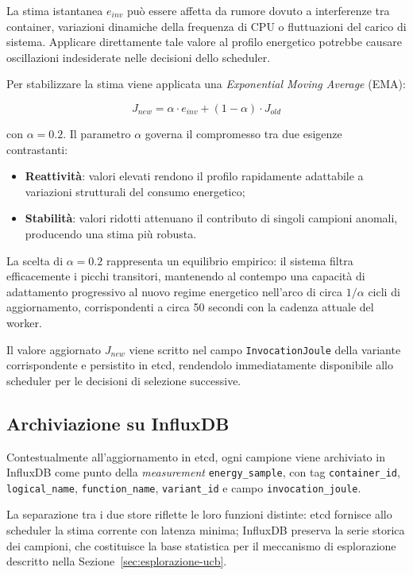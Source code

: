 La stima istantanea $e_{inv}$ può essere affetta da rumore dovuto a
interferenze tra container, variazioni dinamiche della frequenza di CPU
o fluttuazioni del carico di sistema. Applicare direttamente tale valore
al profilo energetico potrebbe causare oscillazioni indesiderate nelle
decisioni dello scheduler.

Per stabilizzare la stima viene applicata una \emph{Exponential Moving
Average} (EMA):

\begin{equation}
    J_{new} = \alpha \cdot e_{inv} + (1 - \alpha) \cdot J_{old}
\end{equation}

con $\alpha = 0.2$. Il parametro $\alpha$ governa il compromesso tra
due esigenze contrastanti:

\begin{itemize}
    \item \textbf{Reattività}: valori elevati rendono il profilo
    rapidamente adattabile a variazioni strutturali del consumo energetico;
    \item \textbf{Stabilità}: valori ridotti attenuano il contributo
    di singoli campioni anomali, producendo una stima più robusta.
\end{itemize}

La scelta di $\alpha = 0.2$ rappresenta un equilibrio empirico: il
sistema filtra efficacemente i picchi transitori, mantenendo al
contempo una capacità di adattamento progressivo al nuovo regime
energetico nell'arco di circa $1/\alpha$ cicli di aggiornamento,
corrispondenti a circa 50 secondi con la cadenza attuale del worker.

Il valore aggiornato $J_{new}$ viene scritto nel campo
\texttt{InvocationJoule} della variante corrispondente e persistito in
etcd, rendendolo immediatamente disponibile allo scheduler per le
decisioni di selezione successive.



\subsection{Archiviazione su InfluxDB}
\label{subsec:influxdb}

Contestualmente all'aggiornamento in etcd, ogni campione viene archiviato
in InfluxDB come punto della \emph{measurement} \texttt{energy\_sample},
con tag \texttt{container\_id}, \texttt{logical\_name},
\texttt{function\_name}, \texttt{variant\_id} e campo
\texttt{invocation\_joule}.

La separazione tra i due store riflette le loro funzioni distinte: etcd
fornisce allo scheduler la stima corrente con latenza minima; InfluxDB
preserva la serie storica dei campioni, che costituisce la base
statistica per il meccanismo di esplorazione descritto nella
Sezione~\ref{sec:esplorazione-ucb}.